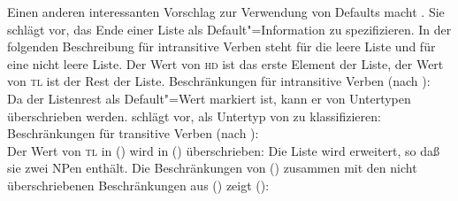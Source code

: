 Einen anderen interessanten Vorschlag zur Verwendung von Defaults macht \citet[--87]{Villavicencio2000a-u}.
Sie schlägt vor, das Ende einer Liste als Default"=Information zu spezifizieren. In der folgenden Beschreibung
für intransitive Verben steht  für die leere Liste und
 für eine nicht leere Liste. 
Der Wert von \textsc{hd} ist das erste Element der Liste, der Wert von \textsc{tl} ist der Rest der Liste.
\ea
Beschränkungen für intransitive Verben (nach \citet{Villavicencio2000a-u}):\\
  \impl
{}
\z
Da der Listenrest als Default"=Wert markiert ist, kann er von Untertypen überschrieben werden.
\citet[--87]{Villavicencio2000a-u} schlägt vor,  als Untertyp
von  zu klassifizieren:
\ea
Beschränkungen für transitive Verben (nach \citet{Villavicencio2000a-u}):\\
 \impl 
{}
\z
Der Wert von \textsc{tl} in () wird in () überschrieben: Die Liste wird erweitert,
so daß sie zwei NPen enthält. Die Beschränkungen von () zusammen mit den nicht
überschriebenen Beschränkungen aus () zeigt ():
\ea
{}
\z



